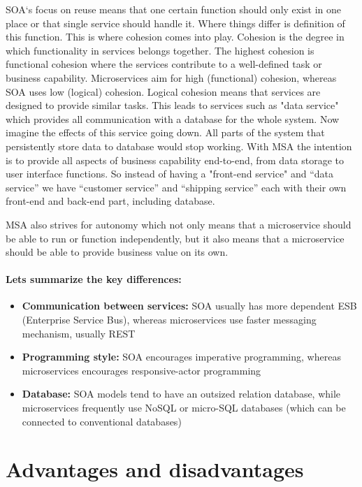 \documentclass[12pt,oneside]{fithesis2}
\begin{document}
SOA`s focus on reuse means that one certain function should only exist in one place or that single service should handle it. Where things differ is definition of this function. This is where cohesion comes into play. Cohesion is the degree in which functionality in services belongs together. The highest cohesion is functional cohesion where the services contribute to a well-defined task or business capability. Microservices aim for high (functional) cohesion, whereas SOA uses low (logical) cohesion. Logical cohesion means that services are designed to provide similar tasks. This leads to services such as "data service"  which provides all communication with a database for the whole system. Now imagine the effects of this service going down. All parts of the system that persistently store data to database would stop working. With MSA the intention is to provide all aspects of business capability end-to-end, from data storage to user interface functions. So instead of having a "front-end service" and “data service” we have “customer service” and “shipping service” each with their own front-end and back-end part, including database.

MSA also strives for autonomy which not only means that a microservice should be able to run or function independently, but it also means that a microservice should be able to provide business value on its own.

\paragraph{Lets summarize the key differences:}

\begin{itemize}
\item \textbf{Communication between services:} SOA usually has more dependent ESB (Enterprise Service Bus), whereas microservices use faster messaging mechanism, usually REST
\item \textbf{Programming style:} SOA encourages imperative programming, whereas microservices encourages responsive-actor programming
\item \textbf{Database:} SOA models tend to have an outsized relation database, while microservices frequently use NoSQL or micro-SQL databases (which can be connected to conventional databases)
\end{itemize}


\section{Advantages and disadvantages}
\end{document}
